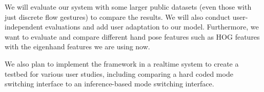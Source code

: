 \documentclass[10pt,twocolumn,letterpaper]{article}
\begin{document}
We will evaluate our system with some larger public datasets (even those with just discrete flow gestures) to compare
the results. We will also conduct user-independent evaluations and add user adaptation to our model.
Furthermore, we want to evaluate and compare different hand pose features such as HOG features with the eigenhand features we are using now.

We also plan to implement the framework in a realtime system
to create a testbed for various user studies, including comparing a hard coded mode switching interface to
an inference-based mode switching interface.

{\small


}
\end{document}

